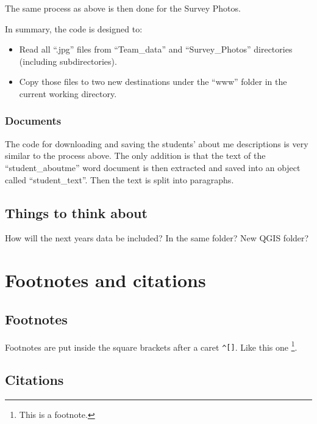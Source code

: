 \documentclass[
]{book}
\providecommand{\tightlist}{%
  \setlength{\itemsep}{0pt}\setlength{\parskip}{0pt}}
\theoremstyle{definition}
\theoremstyle{definition}
\theoremstyle{definition}
\theoremstyle{definition}
\theoremstyle{remark}
\begin{document}
The same process as above is then done for the Survey Photos.

In summary, the code is designed to:

\begin{itemize}
\tightlist
\item
  Read all ``.jpg'' files from ``Team\_data'' and ``Survey\_Photos'' directories (including subdirectories).
\item
  Copy those files to two new destinations under the ``www'' folder in the current working directory.
\end{itemize}

\hypertarget{documents}{%
\subsection{Documents}\label{documents}}

The code for downloading and saving the students' about me descriptions is very similar to the process above. The only addition is that the text of the ``student\_aboutme'' word document is then extracted and saved into an object called ``student\_text''. Then the text is split into paragraphs.

\hypertarget{things-to-think-about}{%
\section{Things to think about}\label{things-to-think-about}}

How will the next years data be included? In the same folder? New QGIS folder?

\hypertarget{footnotes-and-citations}{%
\chapter{Footnotes and citations}\label{footnotes-and-citations}}

\hypertarget{footnotes}{%
\section{Footnotes}\label{footnotes}}

Footnotes are put inside the square brackets after a caret \texttt{\^{}{[}{]}}. Like this one \footnote{This is a footnote.}.

\hypertarget{citations}{%
\section{Citations}\label{citations}}
\end{document}
